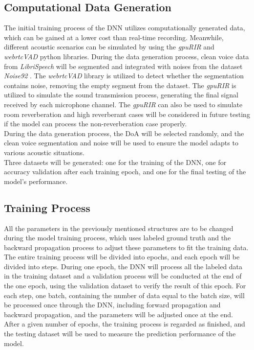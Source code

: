 \subsection*{Computational Data Generation}
The initial training process of the DNN utilizes computationally generated data, which can be gained at a lower cost than real-time recording. Meanwhile, different acoustic scenarios can be simulated by using the \textit{gpuRIR} \cite{diaz-guerra_gpurir_2021} and \textit{webrtcVAD} python libraries. During the data generation process, clean voice data from \textit{LibriSpeech} \cite{panayotov_resource_2015} will be segmented and integrated with noises from the dataset \textit{Noise92} \cite{andrew_assessment_1993}. The \textit{webrtcVAD} library is utilized to detect whether the segmentation contains noise, removing the empty segment from the dataset. The \textit{gpuRIR} \cite{diaz-guerra_gpurir_2021} is utilized to simulate the sound transmission process, generating the final signal received by each microphone channel. The \textit{gpuRIR} \cite{diaz-guerra_gpurir_2021} can also be used to simulate room reverberation and high reverberant cases will be considered in future testing if the model can process the non-reverberation case properly.\\
During the data generation process, the DoA will be selected randomly, and the clean voice segmentation and noise will be used to ensure the model adapts to various acoustic situations.\\
Three datasets will be generated: one for the training of the DNN, one for accuracy validation after each training epoch, and one for the final testing of the model's performance.

\subsection*{Training Process}
All the parameters in the previously mentioned structures are to be changed during the model training process, which uses labeled ground truth and the backward propagation process to adjust these parameters to fit the training data. \\
The entire training process will be divided into epochs, and each epoch will be divided into steps. During one epoch, the DNN will process all the labeled data in the training dataset and a validation process will be conducted at the end of the one epoch, using the validation dataset to verify the result of this epoch. For each step, one batch, containing the number of data equal to the batch size, will be processed once through the DNN, including forward propagation and backward propagation, and the parameters will be adjusted once at the end.\\
After a given number of epochs, the training process is regarded as finished, and the testing dataset will be used to measure the prediction performance of the model.
